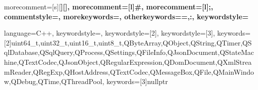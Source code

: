 {
    morecomment=[s][\color{Orchid}\bfseries]{[}{]},
    morecomment=[l]{\#},
    morecomment=[l]{;},
    commentstyle=\color{gray}\ttfamily,
    morekeywords={},
    otherkeywords={=,:},
    keywordstyle={\color{Green}\bfseries}
}

{
    language=C++,
    keywordstyle={\color{blue}\bfseries},
    keywordstyle=[2]{\color{Plum}\bfseries},
    keywordstyle=[3]\color{Orange},
    keywords=[2]{uint64_t,uint32_t,uint16_t,uint8_t,QByteArray,QObject,QString,QTimer,QSqlDatabase,QSqlQuery,QProcess,QSettings,QFileInfo,QJsonDocument,QStateMachine,QTextCodec,QJsonObject,QRegularExpression,QDomDocument,QXmlStreamReader,QRegExp,QHostAddress,QTextCodec,QMessageBox,QFile,QMainWindow,QDebug,QTime,QThreadPool},
    keywords=[3]{nullptr}
}



